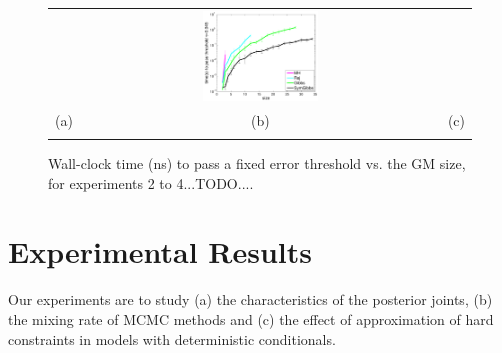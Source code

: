 \documentclass{article}
\newcommand{\nnn}{0.33}
\newcommand{\nnh}{0.23}
\begin{document}
{\begin{figure}[t!]
\begin{center}
\begin{tabular}{ccc}
& \hspace{-3mm} \includegraphics[width=\nnn\textwidth, height=\nnh\textwidth]{plotsx/conductancex/time_vs_param-errorbar.pdf}
\vspace{-1.5mm}
\\
\hspace{-5mm} \footnotesize(a) 
& \hspace{-4mm} \footnotesize(b) 
& \hspace{-3mm} \footnotesize(c) \\
\multicolumn{3}{c}{}
\end{tabular}
\end{center}
\vspace{-8mm}
\caption{\footnotesize Wall-clock time (ns) to pass a fixed error threshold vs. the GM size, for experiments 2 to 4...TODO....}
\label{fig:resistor}
\vspace{-4mm}
\end{figure}



\section{Experimental Results}
\label{sect:experimental.results}
Our experiments are to study
(a) the characteristics of the posterior joints, 
(b) the mixing rate of MCMC methods and
(c) the effect of approximation of hard constraints
in models with deterministic conditionals. 

}
\end{document}
